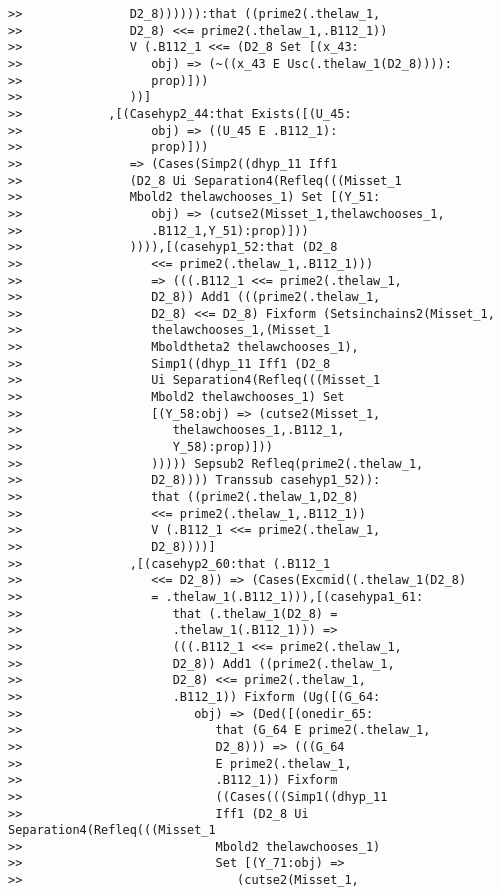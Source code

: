 \documentclass[12pt]{article}
\begin{document}
\begin{verbatim}
>>               D2_8)))))):that ((prime2(.thelaw_1,
>>               D2_8) <<= prime2(.thelaw_1,.B112_1))
>>               V (.B112_1 <<= (D2_8 Set [(x_43:
>>                  obj) => (~((x_43 E Usc(.thelaw_1(D2_8)))):
>>                  prop)]))
>>               ))]
>>            ,[(Casehyp2_44:that Exists([(U_45:
>>                  obj) => ((U_45 E .B112_1):
>>                  prop)]))
>>               => (Cases(Simp2((dhyp_11 Iff1
>>               (D2_8 Ui Separation4(Refleq(((Misset_1
>>               Mbold2 thelawchooses_1) Set [(Y_51:
>>                  obj) => (cutse2(Misset_1,thelawchooses_1,
>>                  .B112_1,Y_51):prop)]))
>>               )))),[(casehyp1_52:that (D2_8
>>                  <<= prime2(.thelaw_1,.B112_1)))
>>                  => (((.B112_1 <<= prime2(.thelaw_1,
>>                  D2_8)) Add1 (((prime2(.thelaw_1,
>>                  D2_8) <<= D2_8) Fixform (Setsinchains2(Misset_1,
>>                  thelawchooses_1,(Misset_1
>>                  Mboldtheta2 thelawchooses_1),
>>                  Simp1((dhyp_11 Iff1 (D2_8
>>                  Ui Separation4(Refleq(((Misset_1
>>                  Mbold2 thelawchooses_1) Set
>>                  [(Y_58:obj) => (cutse2(Misset_1,
>>                     thelawchooses_1,.B112_1,
>>                     Y_58):prop)]))
>>                  ))))) Sepsub2 Refleq(prime2(.thelaw_1,
>>                  D2_8)))) Transsub casehyp1_52)):
>>                  that ((prime2(.thelaw_1,D2_8)
>>                  <<= prime2(.thelaw_1,.B112_1))
>>                  V (.B112_1 <<= prime2(.thelaw_1,
>>                  D2_8))))]
>>               ,[(casehyp2_60:that (.B112_1
>>                  <<= D2_8)) => (Cases(Excmid((.thelaw_1(D2_8)
>>                  = .thelaw_1(.B112_1))),[(casehypa1_61:
>>                     that (.thelaw_1(D2_8) =
>>                     .thelaw_1(.B112_1))) =>
>>                     (((.B112_1 <<= prime2(.thelaw_1,
>>                     D2_8)) Add1 ((prime2(.thelaw_1,
>>                     D2_8) <<= prime2(.thelaw_1,
>>                     .B112_1)) Fixform (Ug([(G_64:
>>                        obj) => (Ded([(onedir_65:
>>                           that (G_64 E prime2(.thelaw_1,
>>                           D2_8))) => (((G_64
>>                           E prime2(.thelaw_1,
>>                           .B112_1)) Fixform
>>                           ((Cases(((Simp1((dhyp_11
>>                           Iff1 (D2_8 Ui Separation4(Refleq(((Misset_1
>>                           Mbold2 thelawchooses_1)
>>                           Set [(Y_71:obj) =>
>>                              (cutse2(Misset_1,

\end{verbatim}
\end{document}
